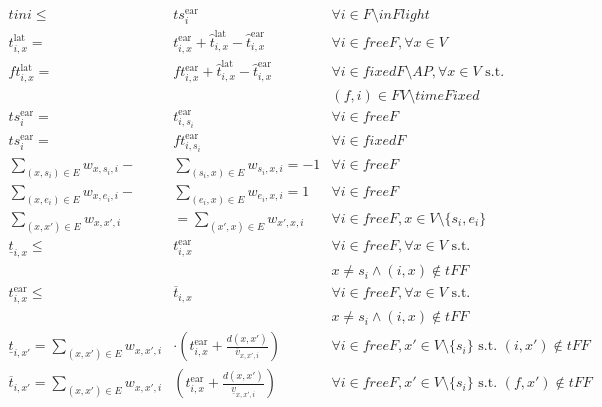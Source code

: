 \documentclass[../thesis.tex]{subfiles}
\begin{document}

{\scriptsize
\begin{align}
    tini \leq & ts^\text{ear}_i &\forall i\in F\setminus inFlight\\
    t^\text{lat}_{i,x}=& t^\text{ear}_{i,x}+\hat t^\text{lat}_{i,x} -\hat t^\text{ear}_{i,x}& \forall i\in  freeF, \forall x \in V\\
    ft^\text{lat}_{i,x}=& ft^\text{ear}_{i,x}+\hat t^\text{lat}_{i,x} -\hat t^\text{ear}_{i,x}& \forall i\in  fixedF\setminus AP, \forall x \in V \text{ s.t. }\nonumber\\&&(f,i)\in FV\setminus timeFixed\\
    ts^\text{ear}_i = &t^\text{ear}_{i,s_i} & \forall i\in freeF\\
    ts^\text{ear}_i = &ft^\text{ear}_{i,s_i} & \forall i\in fixedF\\
\sum_{(x,s_i)\in E} w_{x,s_i,i}-& \sum_{(s_i,x)\in E} w_{s_i,x,i}=-1& \forall i\in freeF\\
\sum_{(x,e_i)\in E} w_{x,e_i,i}-& \sum_{(e_i,x)\in E} w_{e_i,x,i}=1& \forall i\in freeF\\
\sum_{(x,x')\in E} w_{x,x',i} & = \sum_{(x',x)\in E} w_{x',x,i} &\forall i \in freeF, x\in V\setminus\{s_i,e_i\}\\
    \underline t_{i,x} \leq& t^\text{ear}_{i,x}
    &\forall i \in  freeF, \forall x\in V\text{ s.t. }\nonumber\\&& x\neq s_i \land (i,x)\notin tFF\\
    t^\text{ear}_{i,x} \leq& \overline t_{i,x}
    &\forall i\in  freeF,\forall x\in V\text{ s.t. }\nonumber\\&&x\neq s_i\land (i,x)\notin tFF\\
    \underline t_{i,x'}=\sum_{(x,x')\in E} w_{x,x',i}&\cdot(t^\text{ear}_{i,x}+\frac{d(x,x')}{\overline v_{x,x',i}})
    &\forall i\in  freeF, x'\in V\setminus\{s_i\}\text{ s.t. } (i,x')\notin tFF\\
    \overline t_{i,x'}=\sum_{(x,x')\in E} w_{x,x',i}&(t^\text{ear}_{i,x}+\frac{d(x,x')}{\underline v_{x,x',i}})
    &\forall i\in  freeF, x'\in V\setminus\{s_i\}\text{ s.t. } (f,x')\notin tFF

\end{align}}
\end{document}
